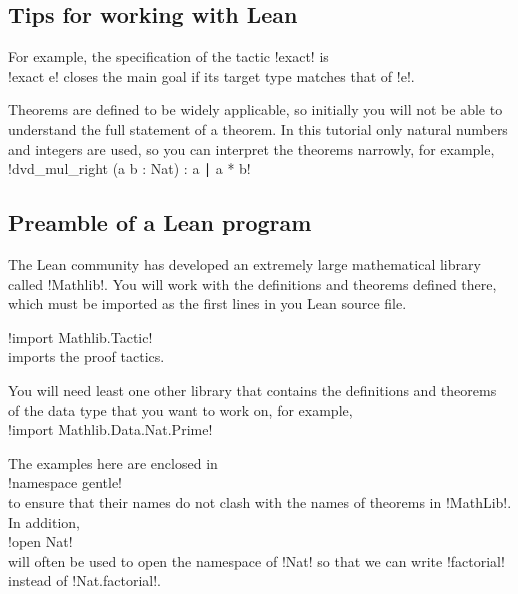\subsection*{Tips for working with Lean}



For example, the specification of the tactic !exact! is\\
\indnt{}!exact e! closes the main goal if its target type matches that of !e!.


Theorems are defined to be widely applicable, so initially you will not be able to understand the full statement of a theorem. In this tutorial only natural numbers and integers are used, so you can interpret the theorems narrowly, for example,\\
\indnt{}!dvd_mul_right (a b : Nat) : a ∣ a * b!

\subsection*{Preamble of a Lean program}

The Lean community has developed an extremely large mathematical library called !Mathlib!. You will work with the definitions and theorems defined there, which must be imported as the first lines in you Lean source file.

\indnt{}!import Mathlib.Tactic!\\
imports the proof tactics.

You will need least one other library that contains the definitions and theorems of the data type that you want to work on, for example,\\
\indnt{}!import Mathlib.Data.Nat.Prime!

The examples here are enclosed in\\
\indnt{}!namespace gentle!\\
to ensure that their names do not clash with the names of theorems in !MathLib!. In addition,\\
\indnt{}!open Nat!\\
will often be used to open the namespace of !Nat! so that we can write !factorial! instead of !Nat.factorial!.

